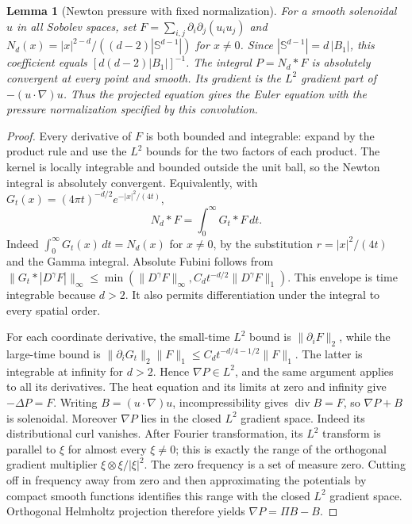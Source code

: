 \documentclass[11pt]{article}
\newtheorem{lemma}[theorem]{Lemma}
\theoremstyle{definition}
\begin{document}
\begin{lemma}[Newton pressure with fixed normalization]\label{lem:newton}
For a smooth solenoidal $u$ in all Sobolev spaces, set
$F=\sum_{i,j}\partial_i\partial_j(u_i u_j)$ and
$N_d(x)=|x|^{2-d}/((d-2)|\mathbb S^{d-1}|)$ for $x\ne0$.
Since $|\mathbb S^{d-1}|=d\,|B_1|$, this coefficient equals
$[d(d-2)|B_1|]^{-1}$. The integral
$P=N_d*F$ is absolutely convergent at every point and smooth.
Its gradient is the $L^2$ gradient part of $-(u\cdot\nabla)u$.
Thus the projected equation gives the Euler equation with the pressure
normalization specified by this convolution.
\end{lemma}
\begin{proof}
Every derivative of $F$ is both bounded and integrable: expand by the
product rule and use the $L^2$ bounds for the two factors of each product.
The kernel is locally integrable and bounded outside the unit ball, so
the Newton integral is absolutely convergent. Equivalently, with
$G_t(x)=(4\pi t)^{-d/2}e^{-|x|^2/(4t)}$,
\[
 N_d*F=\int_0^\infty G_t*F\,dt.
\]
Indeed $\int_0^\infty G_t(x)\,dt=N_d(x)$ for $x\ne0$, by the substitution
$r=|x|^2/(4t)$ and the Gamma integral. Absolute Fubini follows from
$\|G_t*|D^\gamma F|\|_\infty\leq
\min(\|D^\gamma F\|_\infty,C_dt^{-d/2}\|D^\gamma F\|_1)$.
This envelope is time integrable because $d>2$. It also permits
differentiation under the integral to every spatial order.

For each coordinate derivative, the small-time $L^2$ bound is
$\|\partial_i F\|_2$, while the large-time bound is
$\|\partial_iG_t\|_2\|F\|_1\leq C_dt^{-d/4-1/2}\|F\|_1$.
The latter is integrable at infinity for $d>2$. Hence $\nabla P\in L^2$,
and the same argument applies to all its derivatives. The heat equation
and its limits at zero and infinity give $-\Delta P=F$.
Writing $B=(u\cdot\nabla)u$, incompressibility gives
$\operatorname{div}B=F$, so $\nabla P+B$ is solenoidal.
Moreover $\nabla P$ lies in the closed $L^2$ gradient space. Indeed its
distributional curl vanishes. After Fourier transformation, its $L^2$
transform is parallel to $\xi$ for almost every $\xi\ne0$; this is
exactly the range of the orthogonal gradient multiplier
$\xi\otimes\xi/|\xi|^2$. The zero frequency is a set of measure zero.
Cutting off in frequency away from zero and then approximating the
potentials by compact smooth functions identifies this range with the
closed $L^2$ gradient space. Orthogonal
Helmholtz projection therefore yields $\nabla P=\Pi B-B$.


\end{proof}
\end{document}
